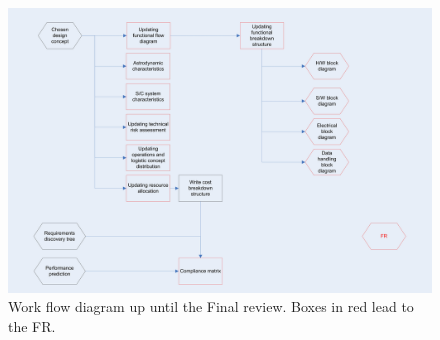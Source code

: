 \newpage
\begin{figure}[H]
\begin{center}
\includegraphics[width=1.2\textwidth, angle=90]{chapters/img/Workflow_diagram_FR.jpg}
\end{center}
\caption{Work flow diagram up until the Final review. Boxes in red lead to the FR.}
\end{figure}